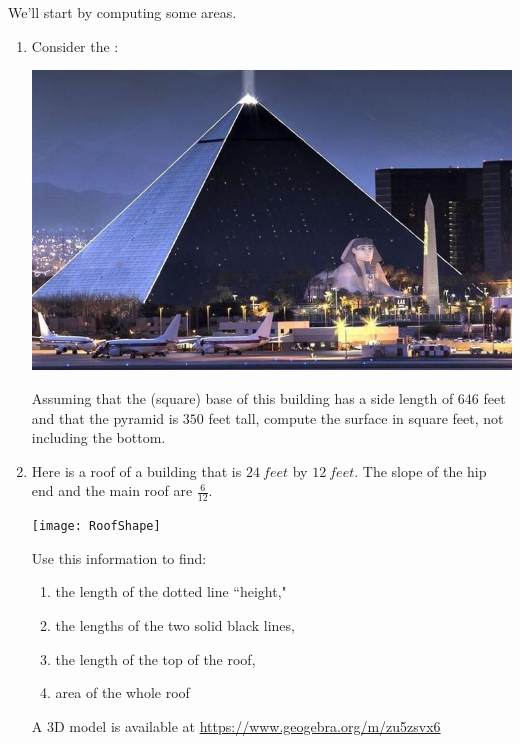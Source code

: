 \documentclass[hints,nooutcomes,noauthor,handout]{ximera}
\begin{document}
\begin{question} We'll start by computing some areas.
\begin{enumerate}
\item Consider the :
  \begin{center}
    \includegraphics[width=.4\textwidth]{pyramid.jpg} 
  \end{center}
 Assuming that the (square) base of this building has a side length of
 $646$ feet and that the pyramid is $350$ feet tall, compute the
surface in square feet, not including the bottom. 
 
\item Here is a roof of a building that is $24\ feet$ by $12\ feet$. The slope of the hip end and the main roof are $\tfrac{6}{12}$. 
  \begin{center}
    \texttt{[image: RoofShape]} 
  \end{center}
  
Use this information to find:
\begin{enumerate}
 \item the length of the dotted line ``height,"
 \item the lengths of the two solid black lines,
 \item the length of the top of the roof,
 \item area of the whole roof
\end{enumerate}
A 3D model is available at \url{https://www.geogebra.org/m/zu5zsvx6}
 \end{enumerate}
 \end{question}
 
 \mynewpage
 
\end{document}
